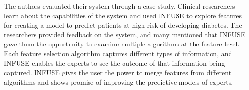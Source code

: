 The authors evaluated their system through a case study. Clinical researchers learn about the capabilities of the system and used INFUSE to explore features for creating a model to predict patients at high risk of developing diabetes. The researchers provided feedback on the system, and many mentioned that INFUSE gave them the opportunity to examine multiple algorithms at the feature-level. Each feature selection algorithm captures different types of information, and INFUSE enables the experts to see the outcome of that information being captured. INFUSE gives the user the power to merge features from different algorithms and shows promise of improving the predictive models of experts.
